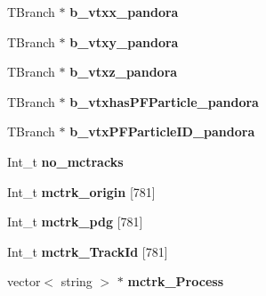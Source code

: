 \begin{DoxyCompactItemize}
\item 
\hypertarget{classanatree_a5d2c77ffb866e3bb8601ecb39770d529}{T\-Branch $\ast$ {\bfseries b\-\_\-vtxx\-\_\-pandora}}\label{classanatree_a5d2c77ffb866e3bb8601ecb39770d529}

\item 
\hypertarget{classanatree_a1407580f2a3f0f6a87d9cc3c5c5521dd}{T\-Branch $\ast$ {\bfseries b\-\_\-vtxy\-\_\-pandora}}\label{classanatree_a1407580f2a3f0f6a87d9cc3c5c5521dd}

\item 
\hypertarget{classanatree_a599d23166be5a996121b5d1f35ef1f56}{T\-Branch $\ast$ {\bfseries b\-\_\-vtxz\-\_\-pandora}}\label{classanatree_a599d23166be5a996121b5d1f35ef1f56}

\item 
\hypertarget{classanatree_a576282c18c6c07b641f46c2d35887715}{T\-Branch $\ast$ {\bfseries b\-\_\-vtxhas\-P\-F\-Particle\-\_\-pandora}}\label{classanatree_a576282c18c6c07b641f46c2d35887715}

\item 
\hypertarget{classanatree_a2113a2c4a5e200f30e6f13b8eff8324d}{T\-Branch $\ast$ {\bfseries b\-\_\-vtx\-P\-F\-Particle\-I\-D\-\_\-pandora}}\label{classanatree_a2113a2c4a5e200f30e6f13b8eff8324d}

\item 
\hypertarget{classanatree_aabdf13b17aaeb4aae05a427dd601955a}{Int\-\_\-t {\bfseries no\-\_\-mctracks}}\label{classanatree_aabdf13b17aaeb4aae05a427dd601955a}

\item 
\hypertarget{classanatree_ab90f9ebf80a49d52dd7acc69e497beb7}{Int\-\_\-t {\bfseries mctrk\-\_\-origin} \mbox{[}781\mbox{]}}\label{classanatree_ab90f9ebf80a49d52dd7acc69e497beb7}

\item 
\hypertarget{classanatree_ad211beb3001f17fa2a94c3d2ebb573e3}{Int\-\_\-t {\bfseries mctrk\-\_\-pdg} \mbox{[}781\mbox{]}}\label{classanatree_ad211beb3001f17fa2a94c3d2ebb573e3}

\item 
\hypertarget{classanatree_a3a80d01d2edbdd595606db5a02fc50b9}{Int\-\_\-t {\bfseries mctrk\-\_\-\-Track\-Id} \mbox{[}781\mbox{]}}\label{classanatree_a3a80d01d2edbdd595606db5a02fc50b9}

\item 
\hypertarget{classanatree_a4015a22b1c9e94bbe8b9cf5f1eb9ebe3}{vector$<$ string $>$ $\ast$ {\bfseries mctrk\-\_\-\-Process}}\label{classanatree_a4015a22b1c9e94bbe8b9cf5f1eb9ebe3}


\end{DoxyCompactItemize}
